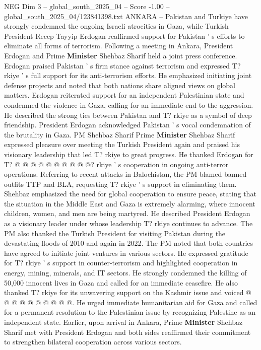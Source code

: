 \begin{textsample}{NEG Dim 3 – global\_south\_2025\_04 – Score -1.00 – global\_south\_2025\_04/123841398.txt}  \label{ex:f3_neg_345}
ANKARA -- Pakistan and Turkiye have strongly condemned the ongoing Israeli atrocities in Gaza, while Turkish President Recep Tayyip Erdogan reaffirmed support for Pakistan ' s efforts to eliminate all forms of terrorism.
Following a meeting in Ankara, President Erdogan and Prime \textbf{Minister} Shehbaz Sharif held a joint press conference.
Erdogan praised Pakistan ' s firm stance against terrorism and expressed T? rkiye ' s full support for its anti-terrorism efforts.
He emphasized initiating joint defense projects and noted that both nations share aligned views on global matters.
Erdogan reiterated support for an independent Palestinian state and condemned the violence in Gaza, calling for an immediate end to the aggression.
He described the strong ties between Pakistan and T? rkiye as a symbol of deep friendship.
President Erdogan acknowledged Pakistan ' s vocal condemnation of the brutality in Gaza.
PM Shehbaz Sharif Prime \textbf{Minister} Shehbaz Sharif expressed pleasure over meeting the Turkish President again and praised his visionary leadership that led T? rkiye to great progress.
He thanked Erdogan for T? @ @ @ @ @ @ @ @ @ @? rkiye ' s cooperation in ongoing anti-terror operations.
Referring to recent attacks in Balochistan, the PM blamed banned outfits TTP and BLA, requesting T? rkiye ' s support in eliminating them.
Shehbaz emphasized the need for global cooperation to ensure peace, stating that the situation in the Middle East and Gaza is extremely alarming, where innocent children, women, and men are being martyred.
He described President Erdogan as a visionary leader under whose leadership T? rkiye continues to advance.
The PM also thanked the Turkish President for visiting Pakistan during the devastating floods of 2010 and again in 2022.
The PM noted that both countries have agreed to initiate joint ventures in various sectors.
He expressed gratitude for T? rkiye ' s support in counter-terrorism and highlighted cooperation in energy, mining, minerals, and IT sectors.
He strongly condemned the killing of 50,000 innocent lives in Gaza and called for an immediate ceasefire.
He also thanked T? rkiye for its unwavering support on the Kashmir issue and voiced @ @ @ @ @ @ @ @ @ @.
He urged immediate humanitarian aid for Gaza and called for a permanent resolution to the Palestinian issue by recognizing Palestine as an independent state.
Earlier, upon arrival in Ankara, Prime \textbf{Minister} Shehbaz Sharif met with President Erdogan and both sides reaffirmed their commitment to strengthen bilateral cooperation across various sectors.

\end{textsample}
